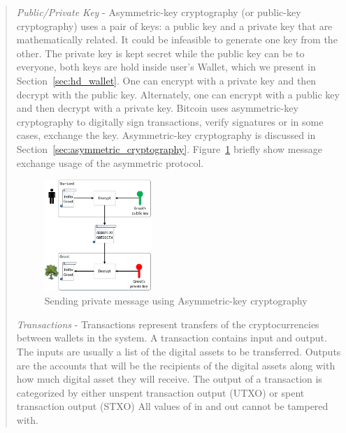 \begin{itemize}
\begin{quote}
		      \emph{Public/Private Key} -
		      Asymmetric-key cryptography (or public-key cryptography) uses a pair of keys: a public key and a private key that are mathematically related. It could be infeasible to generate one key from the other.
		      The private key is kept secret while the public key can be to everyone, both keys are hold inside user's Wallet, which we present in Section~\ref{sec:hd_wallet}.
		      One can encrypt with a private key and then decrypt with the public key.
		      Alternately, one can encrypt with a public key and then decrypt with a private key.
		      Bitcoin uses asymmetric-key cryptography to digitally sign transactions, verify signatures or in some cases, exchange the key.
		      Asymmetric-key cryptography is discussed in Section~\ref{sec:asymmetric_cryptography}.
		      Figure~\ref{fig:asymmetric_cryptography} briefly show message exchange usage of the asymmetric protocol.

		      \begin{figure}[h!]
			      \centering
			      \includegraphics[width=0.4\textwidth]{images/asymmetric_cryptography.png}
			      \caption[An example of concept of Asymmetric-key cryptography]{Sending private message using Asymmetric-key cryptography}
			      \label{fig:asymmetric_cryptography}
		      \end{figure}
		      \bigbreak

		      \emph{Transactions} - Transactions represent transfers of the cryptocurrencies between wallets in the system.
		      A transaction contains input and output. The inputs are usually a list of the digital assets to be transferred.
		      Outputs are	the accounts that will be the recipients of the digital assets along with how much digital asset they will receive.
		      The  output  of  a  transaction  is categorized  by  either  unspent  transaction  output  (UTXO)  or spent  transaction  output  (STXO)
		      All values of in and out cannot be tampered with.


\end{quote}
\end{itemize}
